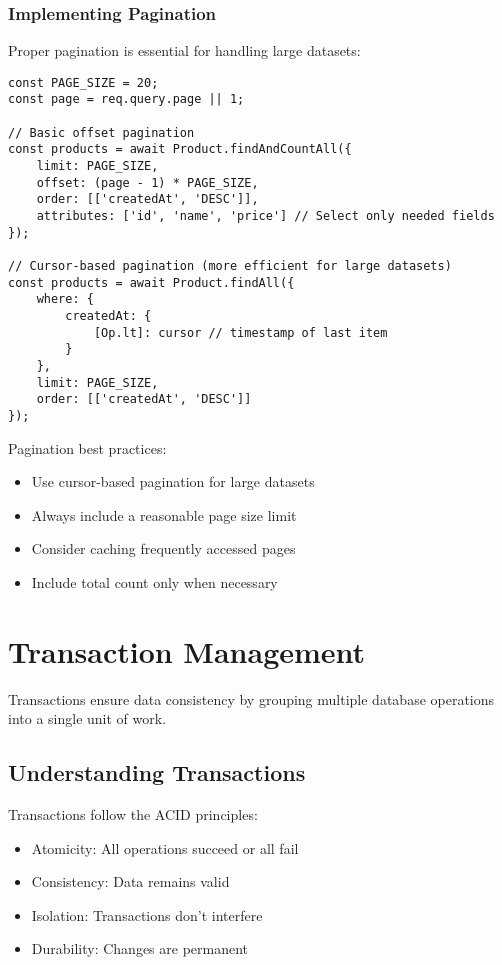 \documentclass[12pt,a4paper]{book}
\begin{document}
	\subsubsection{Implementing Pagination}
	\begin{tcolorbox}[title=Efficient Pagination]
		Proper pagination is essential for handling large datasets:
		
		\begin{verbatim}
const PAGE_SIZE = 20;
const page = req.query.page || 1;

// Basic offset pagination
const products = await Product.findAndCountAll({
	limit: PAGE_SIZE,
	offset: (page - 1) * PAGE_SIZE,
	order: [['createdAt', 'DESC']],
	attributes: ['id', 'name', 'price'] // Select only needed fields
});

// Cursor-based pagination (more efficient for large datasets)
const products = await Product.findAll({
	where: {
		createdAt: {
			[Op.lt]: cursor // timestamp of last item
		}
	},
	limit: PAGE_SIZE,
	order: [['createdAt', 'DESC']]
});
		\end{verbatim}
		
		Pagination best practices:
		\begin{itemize}
			\item Use cursor-based pagination for large datasets
			\item Always include a reasonable page size limit
			\item Consider caching frequently accessed pages
			\item Include total count only when necessary
		\end{itemize}
	\end{tcolorbox}
	
	\section{Transaction Management}
	Transactions ensure data consistency by grouping multiple database operations into a single unit of work.
	
	\subsection{Understanding Transactions}
	\begin{tcolorbox}[title=Transaction Basics]
		Transactions follow the ACID principles:
		\begin{itemize}
			\item Atomicity: All operations succeed or all fail
			\item Consistency: Data remains valid
			\item Isolation: Transactions don't interfere
			\item Durability: Changes are permanent
		\end{itemize}
	\end{tcolorbox}
	
\end{document}
